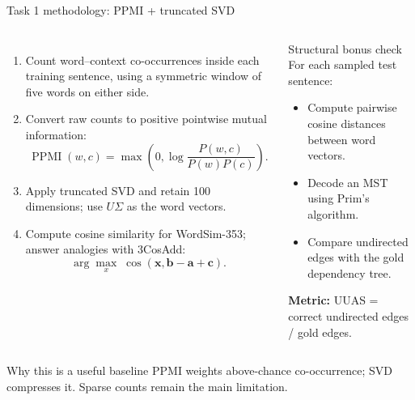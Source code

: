\documentclass[aspectratio=169,9pt]{beamer}
\newcommand{\tightitem}{\setlength{\itemsep}{0.14em}\setlength{\parskip}{0pt}}
\begin{document}
\begin{frame}{Task 1 methodology: PPMI + truncated SVD}
\begin{columns}[T,onlytextwidth]
  \begin{enumerate}\tightitem
    \item Count word--context co-occurrences inside each training sentence, using a symmetric window of five words on either side.
    \item Convert raw counts to positive pointwise mutual information:
      \[
        \operatorname{PPMI}(w,c)=\max\!\left(0,\log\frac{P(w,c)}{P(w)P(c)}\right).
      \]
    \item Apply truncated SVD and retain 100 dimensions; use $U\Sigma$ as the word vectors.
    \item Compute cosine similarity for WordSim-353; answer analogies with 3CosAdd:
      \[
        \arg\max_x\;\cos(\mathbf{x},\mathbf{b}-\mathbf{a}+\mathbf{c}).
      \]
  \end{enumerate}
  \begin{block}{Structural bonus check}
    For each sampled test sentence:
    \begin{itemize}\tightitem
      \item Compute pairwise cosine distances between word vectors.
      \item Decode an MST using Prim's algorithm.
      \item Compare undirected edges with the gold dependency tree.
    \end{itemize}
    \vspace{0.2em}
    \textbf{Metric:} UUAS = correct undirected edges / gold edges.
  \end{block}
\end{columns}
\vspace{0.25em}
\begin{exampleblock}{Why this is a useful baseline}
PPMI weights above-chance co-occurrence; SVD compresses it. Sparse counts remain the main limitation.
\end{exampleblock}
\end{frame}
\end{document}
